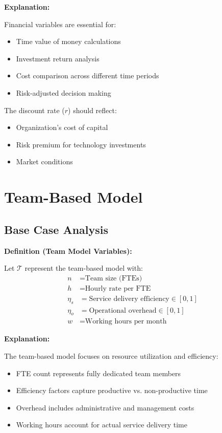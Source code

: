 \documentclass[12pt,a4paper]{article}
\newenvironment{definition}[1]
{\begin{mdframed}[style=definitionstyle]
\textbf{Definition (#1):}\par}
{\end{mdframed}}
\newenvironment{explanation}
{\begin{mdframed}[style=explanationstyle]
\textbf{Explanation:}\par}
{\end{mdframed}}
\begin{document}
\begin{explanation}
Financial variables are essential for:
\begin{itemize}
    \item Time value of money calculations
    \item Investment return analysis
    \item Cost comparison across different time periods
    \item Risk-adjusted decision making
\end{itemize}
The discount rate ($r$) should reflect:
\begin{itemize}
    \item Organization's cost of capital
    \item Risk premium for technology investments
    \item Market conditions
\end{itemize}
\end{explanation}

\section{Team-Based Model}
\subsection{Base Case Analysis}
\begin{definition}{Team Model Variables}
Let $\mathcal{T}$ represent the team-based model with:
\begin{align*}
    n &= \text{Team size (FTEs)} \\
    h &= \text{Hourly rate per FTE} \\
    \eta_s &= \text{Service delivery efficiency} \in [0,1] \\
    \eta_o &= \text{Operational overhead} \in [0,1] \\
    w &= \text{Working hours per month}
\end{align*}
\end{definition}

\begin{explanation}
The team-based model focuses on resource utilization and efficiency:
\begin{itemize}
    \item FTE count represents fully dedicated team members
    \item Efficiency factors capture productive vs. non-productive time
    \item Overhead includes administrative and management costs
    \item Working hours account for actual service delivery time
\end{itemize}
\end{explanation}
\end{document}
